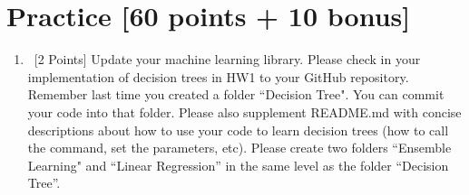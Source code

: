 \documentclass[12pt, fullpage,letterpaper]{article}
\begin{document}
\section{Practice [60 points + 10 bonus]}
\begin{enumerate}
	\item~[2 Points] Update your machine learning library. Please check in your implementation of decision trees in HW1 to your GitHub repository. Remember last time you created a folder ``Decision Tree". You can commit your code into that folder. Please also supplement README.md with concise descriptions about how to use your code to learn decision trees (how to call the command, set the parameters, etc). Please create two folders ``Ensemble Learning" and ``Linear Regression''  in the same level as the folder ``Decision Tree''.  



\end{enumerate}
\end{document}
